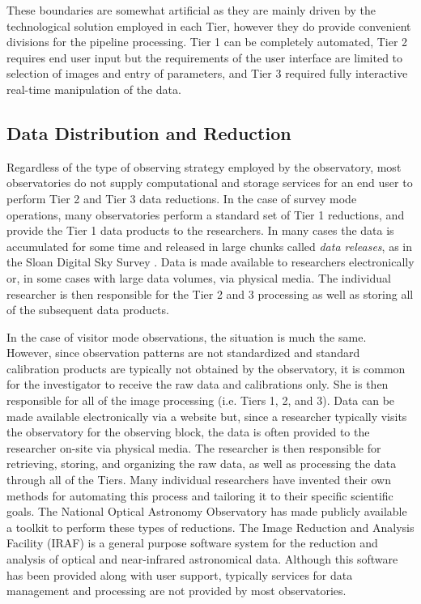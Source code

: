 \documentclass[10pt,conference]{IEEEtran}
\begin{document}
These boundaries are somewhat artificial as they are mainly driven by the technological solution employed in each Tier, however they do provide convenient divisions for the pipeline processing. Tier 1 can be completely automated, Tier 2 requires end user input but the requirements of the user interface are limited to selection of images and entry of parameters, and Tier 3 required fully interactive real-time manipulation of the data. 

\subsection{Data Distribution and Reduction}\label{sec:reduction}

Regardless of the type of observing strategy employed by the observatory, most observatories do not supply computational and storage services for an end user to perform Tier 2 and Tier 3 data reductions. In the case of survey mode operations, many observatories perform a standard set of Tier 1 reductions, and provide the Tier 1 data products to the researchers. In many cases the data is accumulated for some time and released in large chunks called {\it data releases}, as in the Sloan Digital Sky Survey \cite{york2000}. Data is made available to researchers electronically or, in some cases with large data volumes, via physical media. The individual researcher is then responsible for the Tier 2 and 3 processing as well as storing all of the subsequent data products.

In the case of visitor mode observations, the situation is much the same. However, since observation patterns are not standardized and standard calibration products are typically not obtained by the observatory, it is common for the investigator to receive the raw data and calibrations only. She is then responsible for all of the image processing (i.e. Tiers 1, 2, and 3). Data can be made available electronically via a website but, since a researcher typically visits the observatory for the observing block, the data is often provided to the researcher on-site via physical media. The researcher is then responsible for retrieving, storing, and organizing the raw data, as well as processing the data through all of the Tiers. Many individual researchers have invented their own methods for automating this process and tailoring it to their specific scientific goals. The National Optical Astronomy Observatory has made publicly available a toolkit to perform these types of reductions. The Image Reduction and Analysis Facility (IRAF) is a general purpose software system for the reduction and analysis of optical and near-infrared astronomical data. Although this software has been provided along with user support, typically services for data management and processing are not provided by most observatories. 
\end{document}
